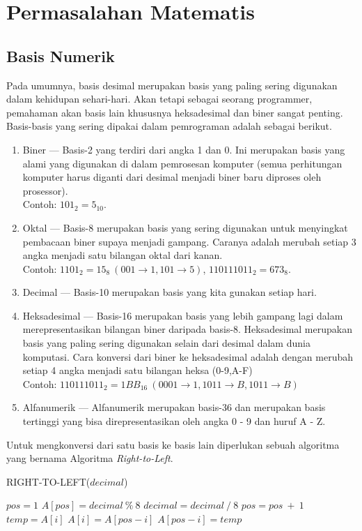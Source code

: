 \chapter{Permasalahan Matematis}\label{ch:modul2}


\section{Basis Numerik}
Pada umumnya, basis desimal merupakan basis yang paling sering digunakan dalam kehidupan sehari-hari. Akan tetapi sebagai seorang programmer, pemahaman akan basis lain khususnya heksadesimal dan biner sangat penting. Basis-basis yang sering dipakai dalam pemrograman adalah sebagai berikut.
\begin{enumerate}
	\item Biner --- Basis-2 yang terdiri dari angka 1 dan 0. Ini merupakan basis yang alami yang digunakan di dalam pemrosesan komputer (semua perhitungan komputer harus diganti dari desimal menjadi biner baru diproses oleh prosessor). \\
	Contoh: $101_2 = 5_{10}$.
	\item Oktal --- Basis-8 merupakan basis yang sering digunakan untuk menyingkat pembacaan biner supaya menjadi gampang. Caranya adalah merubah setiap 3 angka menjadi satu bilangan oktal dari kanan.\\
	Contoh: $1101_2 = 15_8\ (001\rightarrow1, 101\rightarrow5)$, $110111011_2 = 673_8$.
	\item Decimal --- Basis-10 merupakan basis yang kita gunakan setiap hari.
	\item Heksadesimal --- Basis-16 merupakan basis yang lebih gampang lagi dalam merepresentasikan bilangan biner daripada basis-8. Heksadesimal merupakan basis yang paling sering digunakan selain dari desimal dalam dunia komputasi. Cara konversi dari biner ke heksadesimal adalah dengan merubah setiap 4 angka menjadi satu bilangan heksa (0-9,A-F)\\
	Contoh: $110111011_2 = 1BB_{16}\ (0001\rightarrow1, 1011\rightarrow B, 1011\rightarrow B)$
	\item Alfanumerik --- Alfanumerik merupakan basis-36 dan merupakan basis tertinggi yang bisa direpresentasikan oleh angka 0 - 9 dan huruf A - Z.  
\end{enumerate}

Untuk mengkonversi dari satu basis ke basis lain diperlukan sebuah algoritma yang bernama Algoritma \textit{Right-to-Left}. 

\begin{algorithm}[H]
	\caption{RIGHT-TO-LEFT($decimal$)}
	\label{algo:rightToLeft}
	\begin{algorithmic}[1]
		\STATE $pos = 1$
			\STATE $A[pos] = decimal\ \%\ 8$  
			\STATE $decimal = decimal\ /\ 8$
			\STATE $pos = pos\ +\ 1$
		\ENDWHILE
			\STATE $temp = A[i]$
			\STATE $A[i] = A[pos-i]$
			\STATE $A[pos-i] = temp$
		\ENDFOR
	\end{algorithmic}
\end{algorithm}




